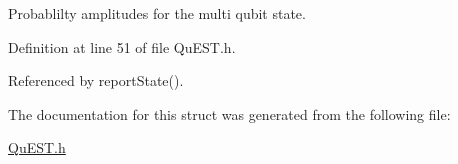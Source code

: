 Probablilty amplitudes for the multi qubit state. 



Definition at line 51 of file Qu\+E\+S\+T.\+h.



Referenced by report\+State().



The documentation for this struct was generated from the following file\+:\begin{DoxyCompactItemize}
\item 
\mbox{\hyperlink{QuEST_8h}{Qu\+E\+S\+T.\+h}}\end{DoxyCompactItemize}
